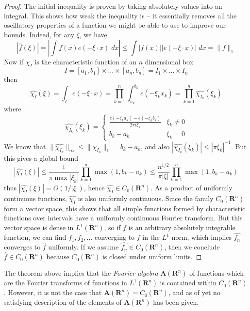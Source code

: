 \begin{proof}
	The initial inequality is proven by taking absolutely values into an integral. This shows how weak the inequality is -- it essentially removes all the oscillatory properties of a function we might be able to use to improve our bounds. Indeed, for any $\xi$, we have
	\[ |\widehat{f}(\xi)| = \left| \int f(x) e(- \xi \cdot x)\; dx \right| \leq \int |f(x)| |e(- \xi \cdot x)|\; dx = \| f \|_1 \]
	Now if $\chi_I$ is the characteristic function of an $n$ dimensional box
	\[ I = [a_1,b_1] \times \dots \times [a_n,b_n] = I_1 \times \dots \times I_n \]
	then
	\[ \widehat{\chi_I}(\xi) = \int_I e(- \xi \cdot x) = \prod_{k = 1}^n \int_{a_k}^{b_k} e(- \xi_k x_k) = \prod_{k = 1}^n \widehat{\chi_{I_k}}(\xi_k) \]
	where
	\[ \widehat{\chi_{I_k}}(\xi_k) = \begin{cases} \frac{e(- \xi_k a_k) - e(- \xi_k b_k)}{2 \pi i \xi_k} & \xi_k \neq 0 \\ b_k - a_k & \xi_k = 0 \end{cases} \]
	We know that $\| \widehat{\chi_{I_k}} \|_\infty \leq \| \chi_{I_k} \|_1 = b_k - a_k$, and also $|\widehat{\chi_{I_k}}(\xi_k)| \leq |\pi \xi_k|^{-1}$. But this gives a global bound
	\[ |\widehat{\chi_I}(\xi)| \leq \frac{1}{\pi \max |\xi_k|} \prod_{k = 1}^n \max(1, b_k - a_k) \leq \frac{n^{1/2}}{\pi |\xi|} \prod_{k = 1}^n \max(1,b_k - a_k) \]
	thus $|\widehat{\chi_I}(\xi)| = O(1/|\xi|)$, hence $\widehat{\chi_I} \in C_0(\mathbf{R}^n)$. As a product of uniformly continuous functions, $\widehat{\chi_I}$ is also uniformly continuous. Since the family $C_0(\mathbf{R}^n)$ form a vector space, this shows that all simple functions formed by characteristic functions over intervals have a uniformly continuous Fourier transform. But this vector space is dense in $L^1(\mathbf{R}^n)$, so if $f$ is an arbitrary absolutely integrable function, we can find $f_1, f_2, \dots$ converging to $f$ in the $L^1$ norm, which implies $\widehat{f_n}$ converges to $\widehat{f}$ uniformly. If we assume $\widehat{f_n} \in C_0(\mathbf{R}^n)$, then we conclude $\widehat{f} \in C_0(\mathbf{R}^n)$ because $C_0(\mathbf{R}^n)$ is closed under uniform limits.
\end{proof}

\begin{remark}
	The theorem above implies that the {\it Fourier algebra} $\mathbf{A}(\mathbf{R}^n)$ of functions which are the Fourier transforms of functions in $L^1(\mathbf{R}^n)$ is contained within $C_0(\mathbf{R}^n)$. However, it is not the case that $\mathbf{A}(\mathbf{R}^n) = C_0(\mathbf{R}^n)$, and as of yet no satisfying description of the elements of $\mathbf{A}(\mathbf{R}^n)$ has been given.
\end{remark}

